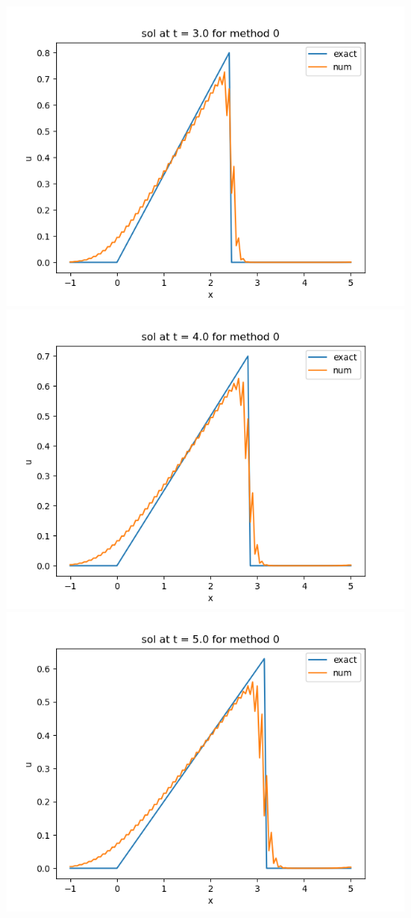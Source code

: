 \documentclass{article}
\begin{document}
\begin{enumerate}
\begin{center}
	\includegraphics[scale=.23]{hw13 sol t = 3 method 0}
	\includegraphics[scale=.3]{hw13 sol t = 4 method 0}
	\includegraphics[scale=.3]{hw13 sol t = 5 method 0}

\end{center}
\end{enumerate}
\end{document}
